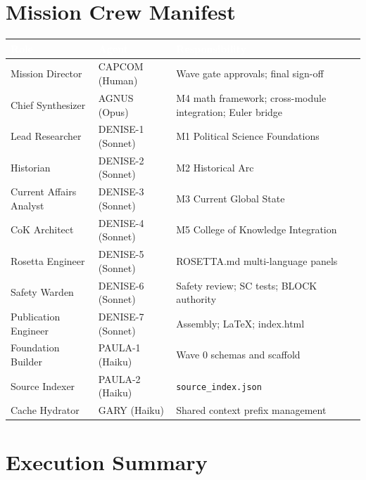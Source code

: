 \documentclass[11pt,letterpaper]{article}
\newcommand{\tableheader}[1]{\textbf{\sffamily\textcolor{white}{#1}}}
\begin{document}
\section{Mission Crew Manifest}

\begin{center}
\begin{tabularx}{\textwidth}{L{2.5cm}L{2.5cm}X}
\toprule
{}
\tableheader{Role} & \tableheader{Agent} & \tableheader{Responsibility} \\
\midrule
Mission Director & CAPCOM (Human) & Wave gate approvals; final sign-off \\
Chief Synthesizer & AGNUS (Opus) & M4 math framework; cross-module integration; Euler bridge \\
Lead Researcher & DENISE-1 (Sonnet) & M1 Political Science Foundations \\
Historian & DENISE-2 (Sonnet) & M2 Historical Arc \\
Current Affairs Analyst & DENISE-3 (Sonnet) & M3 Current Global State \\
CoK Architect & DENISE-4 (Sonnet) & M5 College of Knowledge Integration \\
Rosetta Engineer & DENISE-5 (Sonnet) & ROSETTA.md multi-language panels \\
Safety Warden & DENISE-6 (Sonnet) & Safety review; SC tests; BLOCK authority \\
Publication Engineer & DENISE-7 (Sonnet) & Assembly; LaTeX; index.html \\
Foundation Builder & PAULA-1 (Haiku) & Wave 0 schemas and scaffold \\
Source Indexer & PAULA-2 (Haiku) & \texttt{source\_index.json} \\
Cache Hydrator & GARY (Haiku) & Shared context prefix management \\
\bottomrule
\end{tabularx}
\end{center}

\section{Execution Summary}
\end{document}
